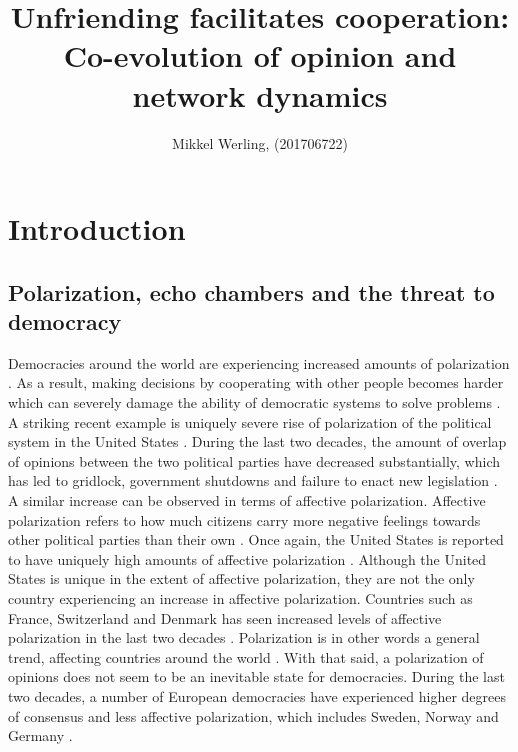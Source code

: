 \documentclass{article}
\title{Unfriending facilitates cooperation: \\Co-evolution of opinion and network dynamics}
\author{Mikkel Werling, (201706722)}
\date{}
\begin{document}
\maketitle
\tableofcontents

\section{Introduction}

\subsection{Polarization, echo chambers and the threat to democracy}

Democracies around the world are experiencing increased amounts of polarization \cite{boxell_cross-country_2020,mccoy_polarization_2018, somer_deja_2018}. As a result, making decisions by cooperating with other people becomes harder which can severely damage the ability of democratic systems to solve problems \cite{andris_rise_2015,levin_dynamics_2021,mccoy_polarization_2018}. A striking recent example is uniquely severe rise of polarization of the political system in the United States \cite{dimock_america_2020}. During the last two decades, the amount of overlap of opinions between the two political parties have decreased substantially, which has led to gridlock, government shutdowns and failure to enact new legislation \cite{andris_rise_2015, pew_research_center_political_2014-1}. A similar increase can be observed in terms of affective polarization. Affective polarization refers to how much citizens carry more negative feelings towards other political parties than their own \cite{boxell_cross-country_2020, iyengar_origins_2019}. Once again, the United States is reported to have uniquely high amounts of affective polarization \cite{boxell_cross-country_2020}. Although the United States is unique in the extent of affective polarization, they are not the only country experiencing an increase in affective polarization. Countries such as France, Switzerland and Denmark has seen increased levels of affective polarization in the last two decades \cite{boxell_cross-country_2020}. Polarization is in other words a general trend, affecting countries around the world \cite{mccoy_polarization_2018, somer_deja_2018, wilson_polarization_2020}. With that said, a polarization of opinions does not seem to be an inevitable state for democracies. During the last two decades, a number of European democracies have experienced higher degrees of consensus and less affective polarization, which includes Sweden, Norway and Germany \cite{boxell_cross-country_2020}. 
\end{document}
